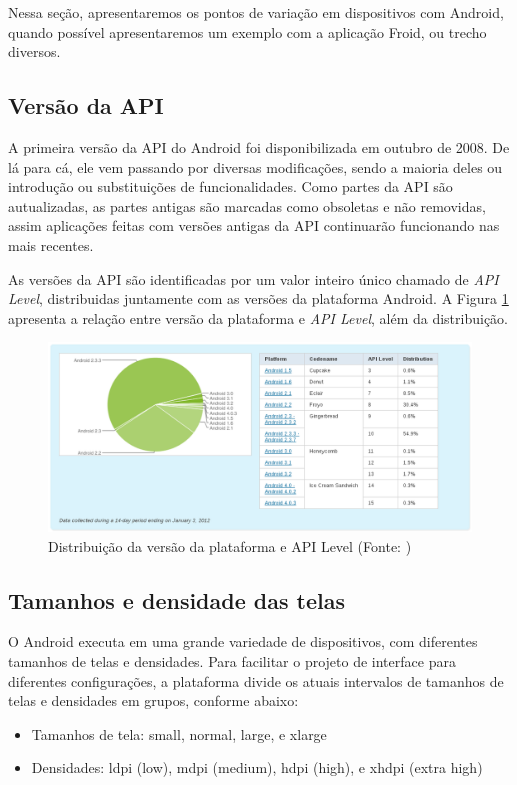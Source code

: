 Nessa seção, apresentaremos os pontos de variação em dispositivos com Android,
quando possível apresentaremos um exemplo com a aplicação Froid, ou trecho diversos.

\subsection{Versão da API}

A primeira versão da API do Android foi disponibilizada em outubro de 2008. De lá 
para cá, ele vem passando por diversas modificações, sendo a maioria deles ou 
introdução ou substituições de funcionalidades. Como partes da API são autualizadas, 
as partes antigas são marcadas como obsoletas e não removidas, assim aplicações feitas
com versões antigas da API continuarão funcionando nas mais recentes.

As versões da API são identificadas por um valor inteiro único chamado de {\it API Level},
distribuidas juntamente com as versões da plataforma Android. A Figura \ref{api_level} 
apresenta a relação entre versão da plataforma e {\it API Level}, além da distribuição.

\begin{figure}[h]
    \centering
    \includegraphics[width=15cm]{img/api_level}
    \caption[Distribuição da versão da plataforma e API Level]{Distribuição da versão da plataforma e API Level (Fonte: \cite{platform_versions}) }
    \label{api_level}
\end{figure}

\subsection{Tamanhos e densidade das telas}

O Android executa em uma grande variedade de dispositivos, com diferentes tamanhos
 de telas e densidades. Para facilitar o projeto de interface para diferentes 
 configurações, a plataforma divide os atuais intervalos de tamanhos de telas e
 densidades em grupos, conforme abaixo:
\begin{itemize}
    \item Tamanhos de tela: small, normal, large, e xlarge
    \item Densidades: ldpi (low), mdpi (medium), hdpi (high), e xhdpi (extra high)
\end{itemize}
 
